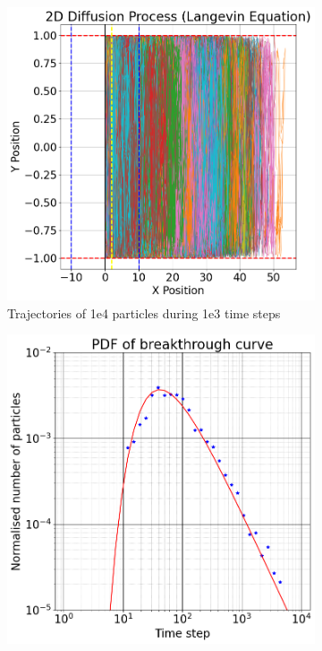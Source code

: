 \documentclass{article}
\begin{document}
\begin{figure}[htbp]
    \centering
    \begin{subfigure}[b]{0.3\textwidth}
        \centering
        \includegraphics[width=\textwidth]{images/trajectoriesSemiInfinite.png} %
        \caption{Trajectories of 1e4 particles during 1e3 time steps}
        \label{fig:subplotTrSemiInf}
    \end{subfigure}
    \hfill
    \begin{subfigure}[b]{0.3\textwidth}
        \centering
        \includegraphics[width=\textwidth]{images/verificationSemi-infinite1e3.png} %

\end{subfigure}
\end{figure}
\end{document}

